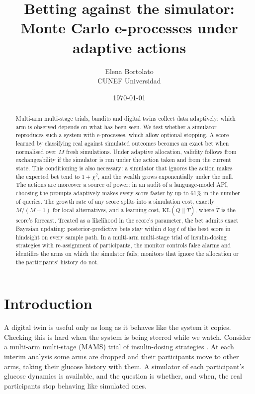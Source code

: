 \documentclass[11pt]{article}
\title{Betting against the simulator:\\
Monte Carlo e-processes under adaptive actions}
\author{Elena Bortolato\\ CUNEF Universidad}
\date{  \today}
\newcommand{\KL}{\mathrm{KL}}
\theoremstyle{remark}
\begin{document}
\maketitle

\begin{abstract}
Multi-arm multi-stage trials, bandits and digital twins collect data
adaptively: which arm is observed depends on what has been seen. We test whether a simulator reproduces such a
system with e-processes, which allow optional stopping. A score learned by classifying real against simulated
outcomes becomes an exact bet when normalised over $M$ fresh simulations. Under adaptive allocation, validity follows from
exchangeability if the simulator is run under the action taken and from the
current state. This conditioning is also necessary: a simulator that ignores
the action makes the expected bet tend to $1+\chi^2$, and the wealth grows
exponentially under the null. The actions are moreover a source of power: in
an audit of a language-model API, choosing the prompts
adaptively makes every score faster by
up to 61\% in the number of queries. The growth rate of any score splits into
a simulation cost, exactly $M/(M+1)$ for local alternatives, and a learning
cost, $\KL(Q\|\tilde T)$, where $\tilde T$ is the score's forecast.
Treated as a likelihood in the score's parameter, the bet admits exact
Bayesian updating: posterior-predictive bets stay within $d\log t$ of the best score in hindsight on
every sample path. In a multi-arm multi-stage trial of insulin-dosing strategies with
re-assignment of participants, the monitor controls
false alarms and identifies the arms on which the simulator fails; monitors
that ignore the allocation or the participants' history do not.
\end{abstract}

\section{Introduction}\label{sec:intro}

A digital twin is useful only as long as it behaves like the system it
copies. Checking this is hard when the system is being steered while we
watch. Consider a multi-arm multi-stage (MAMS) trial of insulin-dosing
strategies \citep{whitehead1997design,magirr2012generalized}. At each interim
analysis some arms are dropped and their participants move to other arms,
taking their glucose history with them. A simulator of each participant's
glucose dynamics is available, and the question is whether, and when, the
real participants stop behaving like simulated ones.
\end{document}
